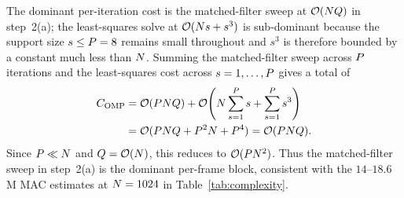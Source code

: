 The dominant per-iteration cost is the matched-filter sweep at $\mathcal{O}(N Q)$ in step~2(a); the least-squares solve at $\mathcal{O}(N s + s^3)$ is sub-dominant because the support size $s \leq P = 8$ remains small throughout and $s^3$ is therefore bounded by a constant much less than $N$. Summing the matched-filter sweep across $P$ iterations and the least-squares cost across $s = 1, \dots, P$ gives a total of
\begin{align*}
C_\text{OMP}
&= \mathcal{O}(P N Q)
 + \mathcal{O}\!\left(N \sum_{s=1}^{P} s
 + \sum_{s=1}^{P} s^3\right) \\
&= \mathcal{O}(P N Q + P^2 N + P^4)
 = \mathcal{O}(P N Q).
\end{align*}
Since $P \ll N$ and $Q = \mathcal{O}(N)$, this reduces to
$\mathcal{O}(P N^2)$. Thus the matched-filter sweep in
step~2(a) is the dominant per-frame block, consistent with the
$14$--$18.6$\,M MAC estimates at $N = 1024$ in
Table~\ref{tab:complexity}.
